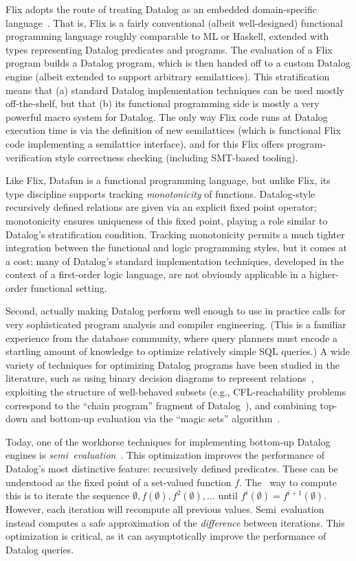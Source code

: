 Flix adopts the route of treating Datalog as an embedded
domain-specific language~\cite{edsl}. That is, Flix is a fairly
conventional (albeit well-designed) functional programming language
roughly comparable to ML or Haskell, extended with types representing
Datalog predicates and programs. The evaluation of a Flix program
builds a Datalog program, which is then handed off to a custom Datalog
engine (albeit extended to support arbitrary semilattices).  This
stratification means that (a) standard Datalog implementation
techniques can be used mostly off-the-shelf, but that (b) its
functional programming side is mostly a very powerful macro system for
Datalog.  The only way Flix code runs at Datalog execution time is via
the definition of new semilattices (which is functional Flix code
implementing a semilattice interface), and for this Flix offers
program-verification style correctness checking (including SMT-based
tooling).

Like Flix, Datafun is a functional programming language, but unlike
Flix, its type discipline supports tracking \emph{monotonicity} of
functions. Datalog-style recursively defined relations are given via
an explicit fixed point operator; monotonicity ensures uniqueness of
this fixed point, playing a role similar to Datalog's stratification
condition.
%
Tracking monotonicity permits a much tighter integration between the
functional and logic programming styles, but it comes at a cost: many
of Datalog's standard implementation techniques, developed in the
context of a first-order logic language, are not obviously applicable
in a higher-order functional setting.

Second, actually making Datalog perform well enough to use in practice
calls for very sophisticated program analysis and compiler
engineering. (This is a familiar experience from the database
community, where query planners must encode a startling amount of
knowledge to optimize relatively simple SQL queries.) A wide variety
of techniques for optimizing Datalog programs have been studied in the
literature, such as using binary decision diagrams to represent
relations~\cite{whaley-phd}, exploiting the structure of well-behaved
subsets (e.g., CFL-reachability problems correspond to the ``chain
program'' fragment of Datalog~\cite{chain-programs}), and combining
top-down and bottom-up evaluation via the ``magic sets''
algorithm~\cite{magic-sets}.

Today, one of the workhorse techniques for implementing bottom-up
Datalog engines is \emph{semi\naive\ evaluation}~\cite{seminaive}.
This optimization improves the performance of Datalog's most
distinctive feature: recursively defined predicates. These can be
understood as the fixed point of a set-valued function $f$. The
\naive\ way to compute this is to iterate the sequence $\emptyset,
f(\emptyset), f^2(\emptyset), \dots$ until $f^i(\emptyset) =
f^{i+1}(\emptyset)$. However, each iteration will recompute all
previous values. Semi\naive\ evaluation instead computes a safe
approximation of the \emph{difference} between iterations. This
optimization is critical, as it can asymptotically improve the
performance of Datalog queries.

